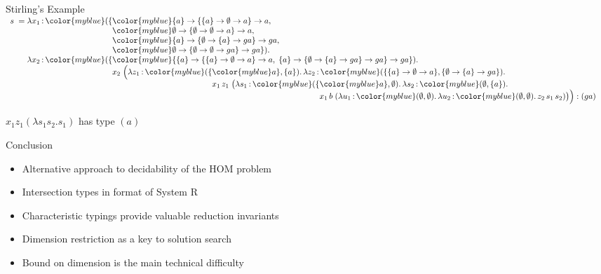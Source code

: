 \documentclass{beamer}
\renewcommand{\:}{\mbox{\,:\,}\xspace}
\newcommand{\type}[1]{{\color{myblue}#1}}
\begin{document}
\begin{frame}{Stirling's Example}
$
\begin{array}{l@{\;}c@{\;}l@{}l@{}l@{}ll}
  s\; & = & \lambda x_1\: \type{(\{} &
                                    \multicolumn{3}{@{}l}{\type{\{a\} \to \{\{a\} \to \emptyset \to a\} \to a,}}\\ & & &
                                    \multicolumn{3}{@{}l}{\type{\emptyset \to \{\emptyset \to \emptyset \to a\} \to a,}}\\ & & &
                                    \multicolumn{3}{@{}l}{\type{\{a\} \to \{\emptyset \to \{a\} \to ga\} \to ga,}}\\ & & &
                                    \multicolumn{3}{@{}l}{\type{\emptyset \to \{\emptyset \to \emptyset \to ga\} \to ga\})}.\,} \\ & & 
            \lambda x_2\: \type{(\{}&
                                    \multicolumn{3}{@{}l}{\type{\{ \{a\} \to \{\{a\} \to \emptyset \to a\} \to a,\;
                                                                   \{a\} \to \{\emptyset \to \{a\} \to ga\} \to ga \} \to ga\})}.\,}
                &\\ & & & 
                x_2\;\Bigl(
                \lambda z_1\:\type{(\{} & \multicolumn{2}{@{}l}{\type{a\}, \{a\})}.\, \lambda z_2\:\type{(\{\{a\} \to \emptyset \to a\}, \{\emptyset \to \{a\} \to ga\})}.\,} \\ & & & &
                         x_1\, z_1\;
    \bigl(
      \lambda s_1\:\type{(\{} & \type{a\}, \emptyset)}.\, \lambda s_2\:\type{(\emptyset, \{a\})}.\,\\ & & & & &
      x_1\, b\;
      (\lambda u_1\:\type{(\emptyset,\emptyset)}.\, \lambda u_2\:\type{(\emptyset,\emptyset)}.\,
      z_2\, s_1\, s_2)
    \bigr)
  \Bigr) : (ga)

  \end{array}
  $


  $x_1z_1(\lambda s_1s_2.s_1)$ has type $(a)$
  \end{frame}
  
\begin{frame}{Conclusion}
\begin{itemize}
    \item Alternative approach to decidability of the HOM problem
    \item Intersection types in format of System R
    \item Characteristic typings provide valuable reduction invariants
    \item Dimension restriction as a key to solution search
    \item Bound on dimension is the main technical difficulty
\end{itemize}
\end{frame}
\end{document}
